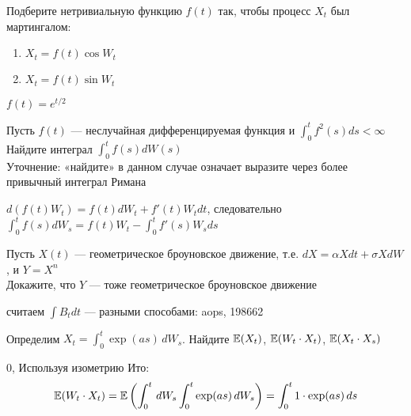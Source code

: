 \begin{problem}
Подберите нетривиальную функцию $f(t)$ так, чтобы процесс $X_t$ был мартингалом:
\begin{enumerate}
\item $X_t=f(t) \cos W_t$
\item $X_t=f(t) \sin W_t$
\end{enumerate}


\begin{sol}
$f(t)=e^{t/2}$
\end{sol}
\end{problem}




\begin{problem}
Пусть $f(t)$ — неслучайная дифференцируемая функция и $\int_{0}^{t}f^{2}(s)ds<\infty$ \\
Найдите интеграл $\int_{0}^{t}f(s)dW(s)$ \\
Уточнение: «найдите» в данном случае означает выразите через более привычный интеграл Римана

\begin{sol}
 $d(f(t)W_t)=f(t)dW_t+f'(t)W_tdt$, следовательно $\int_0^t f(s)dW_s=f(t)W_t-\int_0^t f'(s)W_sds$
\end{sol}
\end{problem}

\begin{problem}
Пусть $X(t)$ — геометрическое броуновское движение, т.е. $dX=\alpha Xdt+\sigma XdW$, и $Y=X^{n}$ \\
Докажите, что $Y$ — тоже геометрическое броуновское движение

\begin{sol}

\end{sol}
\end{problem}

\begin{problem}
считаем $\int B_{t}dt$ — разными способами: aops, 198662

\begin{sol}

\end{sol}
\end{problem}

\begin{problem}
 Определим $X_t=\int_0^t \exp(as)\,dW_s$. Найдите $\mathbb{E}(X_t)$, $\mathbb{E}(W_t\cdot X_t)$, $\mathbb{E}(X_t\cdot X_s)$

\begin{sol}
 $0$, Используя изометрию Ито:
\begin{equation}
\mathbb{E}(W_t\cdot X_t)=\mathbb{E}\left(\int_0^t\,dW_s \int_0^t\exp(as)\,dW_s\right)=\int_0^t 1\cdot \exp(as)\,ds
\end{equation}
\end{sol}
\end{problem}

